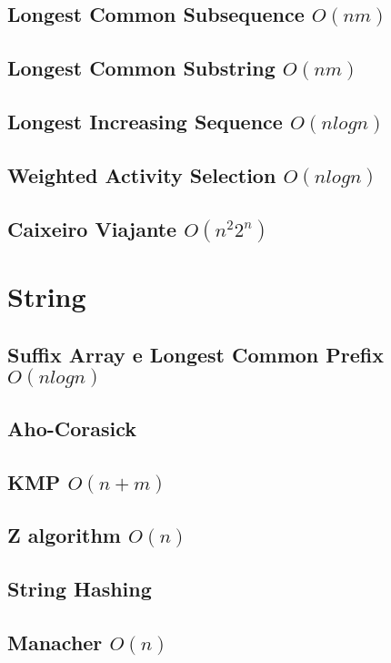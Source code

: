 \documentclass[10pt, letterpaper, twocolumn, twosides]{article}
\begin{document}
\subsection{Longest Common Subsequence ${O(nm)}$}

\subsection{Longest Common Substring ${O(nm)}$}

\subsection{Longest Increasing Sequence ${O(n log n)}$}

\subsection{Weighted Activity Selection ${O(n log n)}$}

\subsection{Caixeiro Viajante ${O(n^2 2^n)}$}

\section{String}
\subsection{Suffix Array e Longest Common Prefix ${O(n log n)}$}

\subsection{Aho-Corasick}

\subsection{KMP ${O(n + m)}$}

\subsection{Z algorithm ${O(n)}$}

\subsection{String Hashing}

\subsection{Manacher ${O(n)}$}

\end{document}
